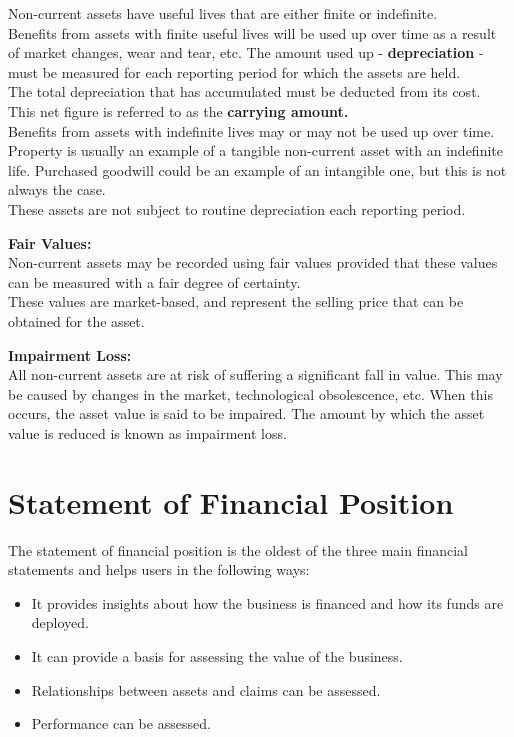 \documentclass{report}
\newenvironment{blackbox}[1][Black]
  {\begin{tcolorbox}[colframe=#1,colback=white]}
  {\end{tcolorbox}}
\begin{document}
Non-current assets have useful lives that are either finite or indefinite.\\

Benefits from assets with finite useful lives will be used up over time as a result of market changes, wear and tear, etc. The amount used up - \textbf{depreciation} - must be measured for each reporting period for which the assets are held.\\
The total depreciation that has accumulated must be deducted from its cost. This net figure is referred to as the \textbf{carrying amount.} \\

Benefits from assets with indefinite lives may or may not be used up over time. Property is usually an example of a tangible non-current asset with an indefinite life. Purchased goodwill could be an example of an intangible one, but this is not always the case.\\
These assets are not subject to routine depreciation each reporting period.\\

\begin{blackbox}
    \textbf{Fair Values:}\\
    Non-current assets may be recorded using fair values provided that these values can be measured with a fair degree of certainty.\\
    These values are market-based, and represent the selling price that can be obtained for the asset.
\end{blackbox}

\begin{blackbox}
    \textbf{Impairment Loss:}\\
    All non-current assets are at risk of suffering a significant fall in value. This may be caused by changes in the market, technological obsolescence, etc. When this occurs, the asset value is said to be impaired. The amount by which the asset value is reduced is known as impairment loss.
\end{blackbox}

\section{Statement of Financial Position}

\begin{blackbox}
The statement of financial position is the oldest of the three main financial statements and helps users in the following ways:
\begin{itemize}
    \item It provides insights about how the business is financed and how its funds are deployed.
    \item It can provide a basis for assessing the value of the business.
    \item Relationships between assets and claims can be assessed. 
    \item Performance can be assessed.
\end{itemize}
\end{blackbox}
\end{document}

